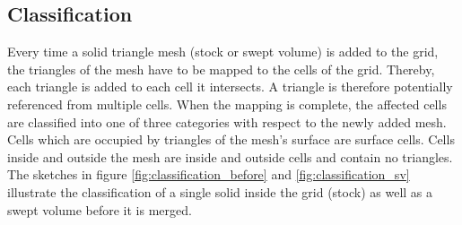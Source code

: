 \subsection{Classification}
\label{sec:classification}

Every time a solid triangle mesh (stock or swept volume) is added to the grid, the triangles of the mesh have to be mapped to the cells of the grid.
Thereby, each triangle is added to each cell it intersects.
A triangle is therefore potentially referenced from multiple cells.
When the mapping is complete, the affected cells are classified into one of three categories with respect to the newly added mesh.
Cells which are occupied by triangles of the mesh's surface are surface cells.
Cells inside and outside the mesh are inside and outside cells and contain no triangles.
The sketches in figure \ref{fig:classification_before} and \ref{fig:classification_sv} illustrate the classification of a single solid inside the grid (\ie stock) as well as a swept volume before it is merged.

